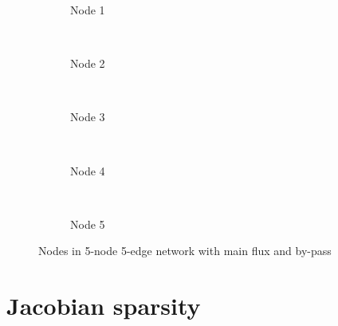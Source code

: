 \begin{figure}[htbp]
    \centering
    \begin{subfigure}[b]{0.48\textwidth}
        
        \caption{Node 1}
        \label{fig:by-pass1}
    \end{subfigure}
    ~
    \begin{subfigure}[b]{0.48\textwidth}
        
        \caption{Node 2}
        \label{fig:by-pass2}
    \end{subfigure}
    ~
    \begin{subfigure}[b]{0.48\textwidth}
        
        \caption{Node 3}
        \label{fig:by-pass3}
    \end{subfigure}
    ~
    \begin{subfigure}[b]{0.48\textwidth}
        
        \caption{Node 4}
        \label{fig:by-pass4}
    \end{subfigure}
    ~
    \begin{subfigure}[b]{0.48\textwidth}
        
        \caption{Node 5}
        \label{fig:by-pass5}
    \end{subfigure}
    \caption{Nodes in 5-node 5-edge network with main flux and by-pass}\label{fig:by-pass_nodes}
\end{figure}

%         
%         

\clearpage

\section{Jacobian sparsity}

